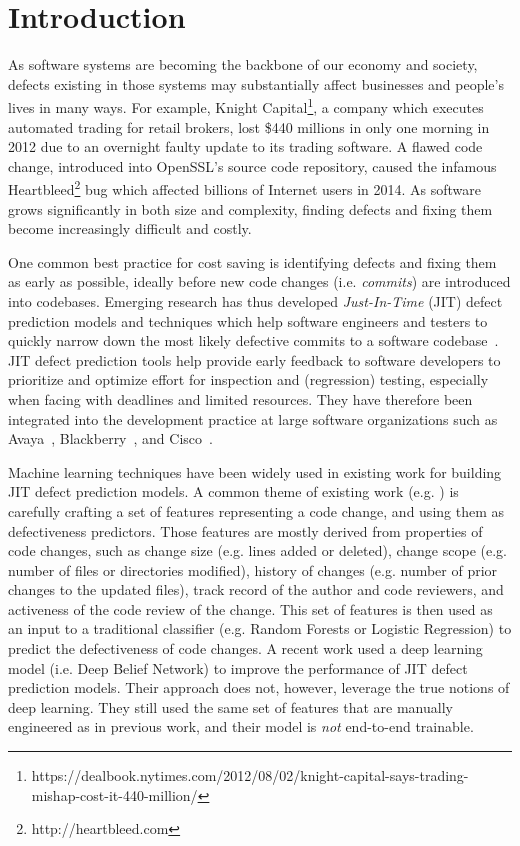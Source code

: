 \section{Introduction}
\label{sec:intro}
As software systems are becoming the backbone of our economy and society, defects existing in those systems may substantially affect businesses and people's lives  in many ways. For example, Knight Capital\footnote{https://dealbook.nytimes.com/2012/08/02/knight-capital-says-trading-mishap-cost-it-440-million/}, a company which executes automated trading  for retail brokers, lost \$440 millions in only one morning in 2012 due to an overnight faulty update to its trading software. A flawed code change, introduced into OpenSSL's source code repository, caused the infamous Heartbleed\footnote{http://heartbleed.com} bug which affected billions of Internet users in 2014. As software grows significantly in both size and complexity, finding defects and fixing them become increasingly difficult and costly.

One common best practice for cost saving is identifying defects and fixing them as early as possible, ideally before new code changes (i.e. \emph{commits}) are introduced into codebases. Emerging research has thus developed \emph{Just-In-Time} (JIT) defect prediction models and techniques which help software engineers and testers to quickly narrow down the most likely defective commits to a software codebase~\cite{KameiS16,D'Ambros:2012:EDP}. JIT defect prediction tools help provide early feedback to software developers to prioritize and optimize effort for inspection and (regression) testing, especially when facing with deadlines and limited resources. They have therefore been integrated into the development practice at large software organizations such as Avaya~\cite{Mockus2000}, Blackberry~\cite{Shihab:2012:ISR}, and Cisco~\cite{Tantithamthavorn:2015:IMP}.

Machine learning techniques have been widely used in existing work for building JIT defect prediction models. A common theme of existing work (e.g. \cite{Kamei:2013:LES,Kim:2008:CSC,Kononenko:2015,Mockus2000}) is carefully crafting a set of features representing a code change, and using them as defectiveness predictors. Those features are mostly derived from properties of code changes, such as change size (e.g. lines added or deleted), change scope (e.g. number of files or directories modified), history of changes (e.g. number of prior changes to the updated files), track record of the author and code reviewers, and activeness of the code review of the change. This set of features is then used as an input to a traditional classifier (e.g. Random Forests or Logistic Regression) to predict the defectiveness of code changes. A recent work \cite{Yang:2015:DLJ}  used a deep learning model (i.e. Deep Belief Network) to improve the performance of JIT defect prediction models. Their approach does not, however, leverage the true notions of deep learning. They still used the same set of features that are manually engineered as in previous work, and their model is \emph{not} end-to-end trainable.

